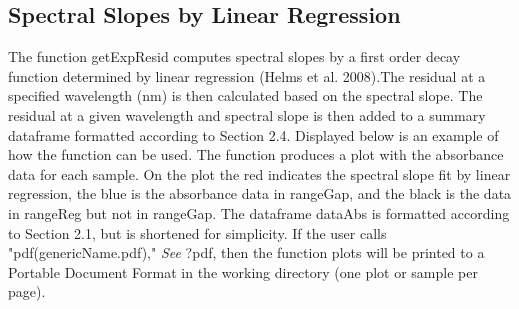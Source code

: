\documentclass[a4paper,11pt]{article}\usepackage[]{graphicx}\usepackage[]{color}
\begin{document}
\subsection{Spectral Slopes by Linear Regression}
The function getExpResid computes spectral slopes by a first order decay function determined by linear regression (Helms et al. 2008).The residual at a specified wavelength (nm) is then calculated based on the spectral slope. The residual at a given wavelength and spectral slope is then added to a summary dataframe formatted according to Section 2.4. Displayed below is an example of how the function can be used. The function produces a plot with the absorbance data for each sample. On the plot the red indicates the spectral slope fit by linear regression, the blue is the absorbance data in rangeGap, and the black is the data in rangeReg but not in rangeGap. The dataframe dataAbs is formatted according to Section 2.1, but is shortened for simplicity. If the user calls "pdf(genericName.pdf)," \emph{See }?pdf, then the function plots will be printed to a Portable Document Format in the working directory (one plot or sample per page). 
\end{document}
